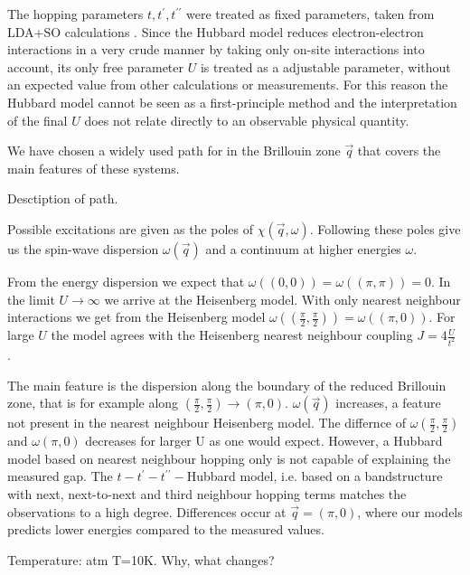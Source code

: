 \documentclass[a4paper,10pt]{report}
\begin{document}
The hopping parameters $t,t^{\prime},t^{\prime \prime}$ were treated as fixed parameters, taken from LDA+SO calculations .
Since the Hubbard model reduces electron-electron interactions in a very crude manner by taking only on-site interactions into account,
its only free parameter $U$ is treated as a adjustable parameter, without an expected value from other calculations or measurements.
For this reason the Hubbard model cannot be seen as a first-principle method 
and the interpretation of the final $U$ does not relate directly to an observable physical quantity.

We have chosen a widely used path for in the Brillouin zone $\vec q$ that covers the main features of these systems.

Desctiption of path. 

Possible excitations are given as the poles of $\chi(\vec q,\omega)$. 
Following these poles give us the spin-wave dispersion $\omega(\vec q)$ and a continuum at higher energies $\omega$.

From the energy dispersion  we expect that $\omega( (0,0) ) = \omega(( \pi,\pi )) = 0$.
In the limit $U\rightarrow \infty$ we arrive at the Heisenberg model. 
With only nearest neighbour interactions we get from the Heisenberg model
$\omega( (\frac{\pi}{2}, \frac{\pi}2 )) = \omega(( \pi,0))$.
For large $U$ the model agrees with the Heisenberg nearest neighbour coupling $J=4\frac{U}{t^2}$ .

The main feature is the dispersion along the boundary of the reduced Brillouin zone, that is for example along $(\frac{\pi}2,\frac{\pi}2) \rightarrow (\pi,0)$.
$\omega(\vec q)$ increases, a feature not present in the nearest neighbour Heisenberg model. 
The differnce of $\omega(\frac{\pi}2,\frac{\pi}2)$ and $\omega(\pi,0)$ decreases for larger U as one would expect.
However, a Hubbard model based on nearest neighbour hopping only is not capable of explaining the measured gap.
The $t-t^{\prime}-t^{\prime \prime}-$Hubbard model, 
i.e. based on a bandstructure with next, next-to-next and third neighbour hopping terms 
matches the observations to a high degree. 
Differences occur at $\vec q = (\pi,0)$, where our models predicts lower energies compared to the measured values.




Temperature: atm T=10K. Why, what changes?
\end{document}
